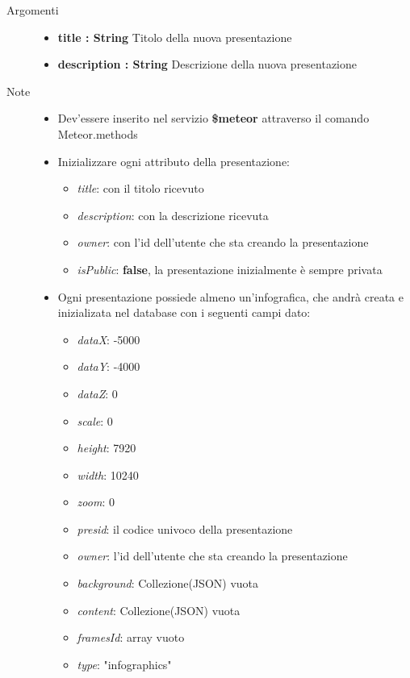 \begin{description}
\begin{description}
		\begin{description}
			\item[Argomenti] \hfill
				\begin{itemize}
				
					\item \textbf{title : String			} \hfill
					Titolo della nuova presentazione
					\item \textbf{description : String			} \hfill
					Descrizione della nuova presentazione
					
				\end{itemize}
			\item[Note] \hfill
			\begin{itemize}
					\item Dev'essere inserito nel servizio \textbf{\$meteor} attraverso il comando Meteor.methods
					\item Inizializzare ogni attributo della presentazione:
					\begin{itemize}
						\item \textit{title}: con il titolo ricevuto
						\item \textit{description}: con la descrizione ricevuta
						\item \textit{owner}: con l'id dell'utente che sta creando la presentazione
						\item \textit{isPublic}: \textbf{false}, la presentazione inizialmente è sempre privata
					\end{itemize}
					\item Ogni presentazione possiede almeno un'infografica, che andrà creata e inizializata nel database con i seguenti campi dato:
					\begin{itemize}
						\item \textit{dataX}: -5000
						\item \textit{dataY}: -4000
						\item \textit{dataZ}: 0
						\item \textit{scale}: 0
						\item \textit{height}: 7920
						\item \textit{width}: 10240
						\item \textit{zoom}: 0
						\item \textit{presid}: il codice univoco della presentazione
						\item \textit{owner}: l'id dell'utente che sta creando la presentazione
						\item \textit{background}: Collezione(JSON) vuota
						\item \textit{content}: Collezione(JSON) vuota
						\item \textit{framesId}: array vuoto
						\item \textit{type}: "infographics"
					\end{itemize}
				\end{itemize}
		\end{description}
	\end{description}


\end{description}
